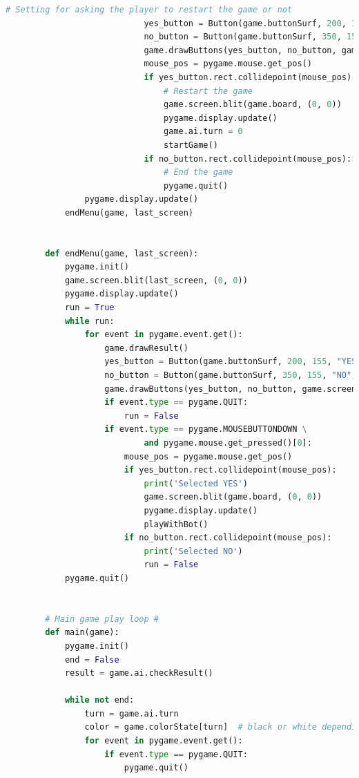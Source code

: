 \documentclass[a4paper]{article}
\begin{document}
\begin{lstlisting}[language=Python]
                            # Setting for asking the player to restart the game or not
                            yes_button = Button(game.buttonSurf, 200, 155, "YES", 18)
                            no_button = Button(game.buttonSurf, 350, 155, "NO", 18)
                            game.drawButtons(yes_button, no_button, game.screen)
                            mouse_pos = pygame.mouse.get_pos()
                            if yes_button.rect.collidepoint(mouse_pos):
                                # Restart the game
                                game.screen.blit(game.board, (0, 0))
                                pygame.display.update()
                                game.ai.turn = 0
                                startGame()
                            if no_button.rect.collidepoint(mouse_pos):
                                # End the game
                                pygame.quit()
                pygame.display.update()
            endMenu(game, last_screen)
        
        
        def endMenu(game, last_screen):
            pygame.init()
            game.screen.blit(last_screen, (0, 0))
            pygame.display.update()
            run = True
            while run:
                for event in pygame.event.get():
                    game.drawResult()
                    yes_button = Button(game.buttonSurf, 200, 155, "YES", 18)
                    no_button = Button(game.buttonSurf, 350, 155, "NO", 18)
                    game.drawButtons(yes_button, no_button, game.screen)
                    if event.type == pygame.QUIT:
                        run = False
                    if event.type == pygame.MOUSEBUTTONDOWN \
                            and pygame.mouse.get_pressed()[0]:
                        mouse_pos = pygame.mouse.get_pos()
                        if yes_button.rect.collidepoint(mouse_pos):
                            print('Selected YES')
                            game.screen.blit(game.board, (0, 0))
                            pygame.display.update()
                            playWithBot()
                        if no_button.rect.collidepoint(mouse_pos):
                            print('Selected NO')
                            run = False
            pygame.quit()
        
        
        # Main game play loop #
        def main(game):
            pygame.init()
            end = False
            result = game.ai.checkResult()
        
            while not end:
                turn = game.ai.turn
                color = game.colorState[turn]  # black or white depending on player's choice
                for event in pygame.event.get():
                    if event.type == pygame.QUIT:
                        pygame.quit()
        

\end{lstlisting}
\end{document}
